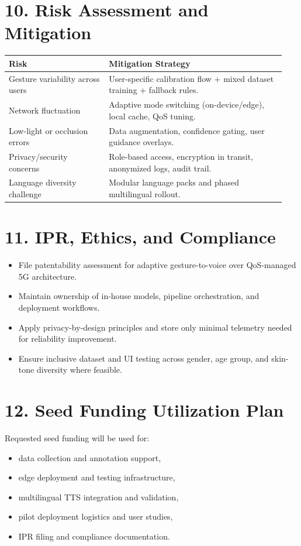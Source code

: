 \documentclass[11pt,a4paper]{article}
\begin{document}
\section*{10. Risk Assessment and Mitigation}
\begin{longtable}{p{0.34\linewidth} p{0.6\linewidth}}
\toprule
\textbf{Risk} & \textbf{Mitigation Strategy} \\
\midrule
Gesture variability across users & User-specific calibration flow + mixed dataset training + fallback rules. \\
Network fluctuation & Adaptive mode switching (on-device/edge), local cache, QoS tuning. \\
Low-light or occlusion errors & Data augmentation, confidence gating, user guidance overlays. \\
Privacy/security concerns & Role-based access, encryption in transit, anonymized logs, audit trail. \\
Language diversity challenge & Modular language packs and phased multilingual rollout. \\
\bottomrule
\end{longtable}

\section*{11. IPR, Ethics, and Compliance}
\begin{itemize}
    \item File patentability assessment for adaptive gesture-to-voice over QoS-managed 5G architecture.
    \item Maintain ownership of in-house models, pipeline orchestration, and deployment workflows.
    \item Apply privacy-by-design principles and store only minimal telemetry needed for reliability improvement.
    \item Ensure inclusive dataset and UI testing across gender, age group, and skin-tone diversity where feasible.
\end{itemize}

\section*{12. Seed Funding Utilization Plan}
Requested seed funding will be used for:
\begin{itemize}
    \item data collection and annotation support,
    \item edge deployment and testing infrastructure,
    \item multilingual TTS integration and validation,
    \item pilot deployment logistics and user studies,
    \item IPR filing and compliance documentation.
\end{itemize}
\end{document}
